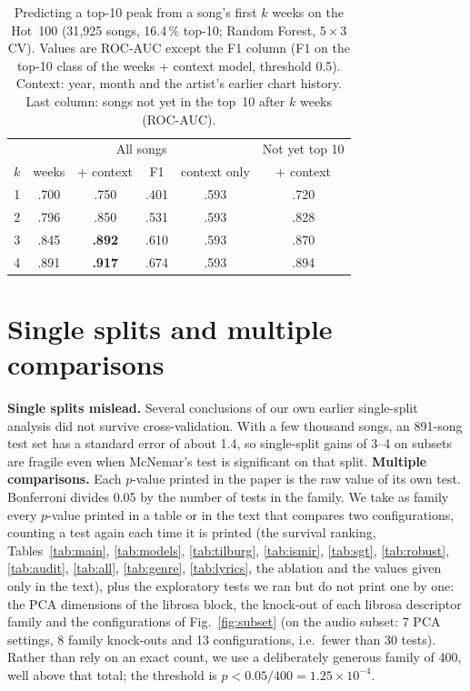 \begin{table}[!htbp]
\centering
\caption{Predicting a top-10 peak from a song's first $k$ weeks on the Hot~100 (31{,}925
songs, 16.4\,\% top-10; Random Forest, $5{\times}3$ CV). Values are ROC-AUC except the F1 column (F1 on the
top-10 class of the weeks + context model, threshold 0.5). Context: year, month and the
artist's earlier chart history. Last column: songs not yet in the top~10 after $k$ weeks (ROC-AUC).}
\label{tab:traj}
\setlength{\tabcolsep}{4pt}
\begin{tabular}{ccccc|c}
\toprule
 & \multicolumn{4}{c|}{All songs} & Not yet top 10 \\
$k$ & weeks & + context & F1 & context only & + context \\
\midrule
1 & .700 & .750 & .401 & .593 & .720 \\
2 & .796 & .850 & .531 & .593 & .828 \\
3 & .845 & \textbf{.892} & .610 & .593 & .870 \\
4 & .891 & \textbf{.917} & .674 & .593 & .894 \\
\bottomrule
\end{tabular}
\end{table}


\FloatBarrier
\section{Single splits and multiple comparisons}\label{app:stats}
\textbf{Single splits mislead.} Several conclusions of our own earlier single-split
analysis did not survive cross-validation. With a few thousand songs, an 891-song test set
has a standard error of about 1.4\pp, so single-split gains of 3--4\pp{} on subsets are
fragile even when McNemar's test is significant on that split.
\textbf{Multiple comparisons.} Each $p$-value printed in the paper is the raw value of its own test. Bonferroni
divides 0.05 by the number of tests in the family. We take as family every $p$-value printed in a table or in the
text that compares two configurations, counting a test again each time it is printed (the survival ranking,
Tables~\ref{tab:main}, \ref{tab:models}, \ref{tab:tilburg}, \ref{tab:ismir}, \ref{tab:sgt}, \ref{tab:robust},
\ref{tab:audit}, \ref{tab:all}, \ref{tab:genre}, \ref{tab:lyrics}, the ablation and the values given only in the
text), plus the exploratory tests we ran but do not print one by one: the PCA dimensions of the librosa block, the
knock-out of each librosa descriptor family and the configurations of Fig.~\ref{fig:subset} (on the audio
subset: 7 PCA settings, 8 family knock-outs and 13 configurations, i.e.\ fewer than 30 tests). Rather than rely on an
exact count, we use a deliberately generous family of 400, well above that total; the threshold is
$p<0.05/400=1.25\times10^{-4}$.

